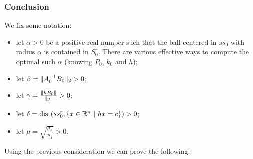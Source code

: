 \documentclass{article}
\theoremstyle{definition}
\DeclarePairedDelimiter{\set}{\{}{\}}
\DeclarePairedDelimiter{\norm}{\lVert }{\rVert}
\newcommand{\R}{\mathbb{R}}
\DeclareMathOperator{\dist}{dist}
\begin{document}
\subsubsection{Conclusion}

We fix some notation:
\begin{itemize}
    \item let $\alpha > 0$ be a positive real number such that the ball centered in $ss_0$ with radius $\alpha$ is contained in $S_0^r$. There are various effective ways to compute the optimal such $\alpha$ (knowing $P_0$, $k_0$ and $h$);
    \item let $\beta = \norm{A_0^{-1} B_0}_2  > 0$;
    \item let $\gamma = \frac{\norm{h B_0}}{\norm{g}} > 0$;
    \item let $\delta = \dist(ss_0^r, \set{x \in \R^n \ | \ hx = c}) > 0$;
    \item let $\mu = \sqrt{\frac{\mu_n}{\mu_1}} > 0.$
\end{itemize}
Using the previous consideration we can prove the following:
\end{document}
